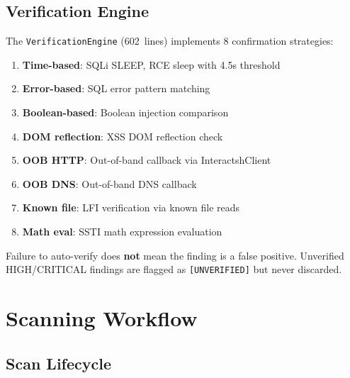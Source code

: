 \documentclass[11pt,a4paper]{article}
\begin{document}
\subsection{Verification Engine}
The \texttt{VerificationEngine} (602~lines) implements 8 confirmation strategies:
\begin{enumerate}[noitemsep]
  \item \textbf{Time-based}: SQLi SLEEP, RCE sleep with 4.5s threshold
  \item \textbf{Error-based}: SQL error pattern matching
  \item \textbf{Boolean-based}: Boolean injection comparison
  \item \textbf{DOM reflection}: XSS DOM reflection check
  \item \textbf{OOB HTTP}: Out-of-band callback via InteractshClient
  \item \textbf{OOB DNS}: Out-of-band DNS callback
  \item \textbf{Known file}: LFI verification via known file reads
  \item \textbf{Math eval}: SSTI math expression evaluation
\end{enumerate}

\begin{warnbox}[Important]
Failure to auto-verify does \textbf{not} mean the finding is a false positive.
Unverified HIGH/CRITICAL findings are flagged as \texttt{[UNVERIFIED]} but never discarded.
\end{warnbox}


\section{Scanning Workflow}
\label{sec:workflow}

\subsection{Scan Lifecycle}
\end{document}
